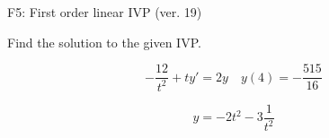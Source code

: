 \begin{exercise}
  \begin{exerciseTitle}F5: First order linear IVP (ver. 19)\end{exerciseTitle}
  \begin{exerciseStatement}
    
Find the solution to the given IVP.

    
\[-\frac{12}{t^{2}} +ty'= 2 y \hspace{1em} y( 4 ) = -\frac{515}{16}\]

  \end{exerciseStatement}
  \begin{exerciseAnswer}
    
\[y= -2 t^ 2 -3 \frac{1}{t^{2}}\]

  \end{exerciseAnswer}
\end{exercise}